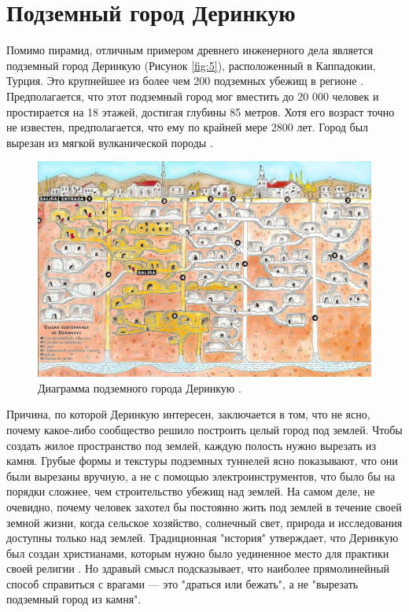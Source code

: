 \documentclass[10pt,twocolumn,letterpaper]{article}
\begin{document}
\section{Подземный город Деринкую}

Помимо пирамид, отличным примером древнего инженерного дела является подземный город Деринкую (Рисунок \ref{fig:5}), расположенный в Каппадокии, Турция. Это крупнейшее из более чем 200 подземных убежищ в регионе \cite{54}. Предполагается, что этот подземный город мог вместить до 20 000 человек и простирается на 18 этажей, достигая глубины 85 метров. Хотя его возраст точно не известен, предполагается, что ему по крайней мере 2800 лет. Город был вырезан из мягкой вулканической породы \cite{52, 53}.

\begin{figure}[b]
\begin{center}
   \includegraphics[width=1\linewidth]{derinkuyu.jpeg}
\end{center}
   \caption{Диаграмма подземного города Деринкую \cite{56}.}
\label{fig:5}
\label{fig:onecol}
\end{figure}
Причина, по которой Деринкую интересен, заключается в том, что не ясно, почему какое-либо сообщество решило построить целый город под землей. Чтобы создать жилое пространство под землей, каждую полость нужно вырезать из камня. Грубые формы и текстуры подземных туннелей ясно показывают, что они были вырезаны вручную, а не с помощью электроинструментов, что было бы на порядки сложнее, чем строительство убежищ над землей. На самом деле, не очевидно, почему человек захотел бы постоянно жить под землей в течение своей земной жизни, когда сельское хозяйство, солнечный свет, природа и исследования доступны только над землей. Традиционная "история" утверждает, что Деринкую был создан христианами, которым нужно было уединенное место для практики своей религии \cite{53}. Но здравый смысл подсказывает, что наиболее прямолинейный способ справиться с врагами — это "драться или бежать", а не "вырезать подземный город из камня".
\end{document}

